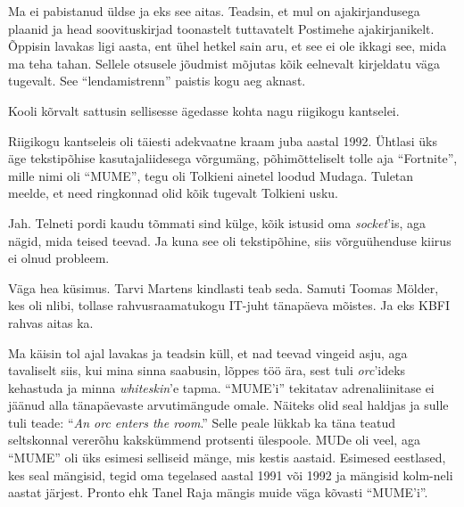 Ma ei pabistanud üldse ja eks see aitas. Teadsin, et mul on
ajakirjandusega plaanid ja head soovituskirjad 
toonastelt tuttavatelt Postimehe ajakirjanikelt. Õppisin 
lavakas ligi aasta, ent ühel hetkel sain aru, et see ei ole ikkagi see, mida ma teha tahan. 
Sellele otsusele jõudmist mõjutas kõik eelnevalt kirjeldatu 
väga tugevalt. See \enquote{lendamistrenn} paistis kogu aeg aknast. 

Kooli kõrvalt sattusin sellisesse ägedasse kohta nagu riigikogu 
kantselei.


Riigikogu kantseleis oli täiesti adekvaatne kraam juba aastal 1992. 
Ühtlasi üks äge tekstipõhise kasutajaliidesega võrgumäng, 
põhimõtteliselt tolle aja \enquote{Fortnite}, mille nimi oli 
\enquote{MUME}, tegu oli Tolkieni ainetel loodud 
Mudaga. Tuletan meelde, et need ringkonnad olid kõik 
tugevalt Tolkieni usku.


Jah. Telneti pordi kaudu tõmmati sind külge, kõik istusid oma 
\emph{socket}'is, aga nägid, mida teised teevad. Ja kuna see oli 
tekstipõhine, siis võrguühenduse kiirus ei olnud probleem.


Väga hea küsimus. Tarvi 
Martens kindlasti teab seda. Samuti
Toomas Mölder, kes oli nlibi, 
tollase rahvusraamatukogu IT-juht tänapäeva mõistes. Ja eks KBFI rahvas aitas ka.


Ma käisin tol ajal lavakas ja teadsin küll, et nad teevad 
vingeid asju, aga tavaliselt siis, kui mina sinna saabusin, 
lõppes töö ära, sest tuli \emph{orc}'ideks kehastuda ja minna 
\emph{whiteskin}'e tapma. \enquote{MUME'i} tekitatav adrenaliinitase ei jäänud alla 
tänapäevaste arvutimängude omale. Näiteks olid seal haldjas ja sulle tuli 
teade: \enquote{\emph{An orc enters the room}.} Selle peale lükkab ka täna teatud 
seltskonnal vererõhu kakskümmend protsenti ülespoole. MUDe oli veel, aga 
\enquote{MUME} oli üks esimesi selliseid mänge, mis kestis aastaid. Esimesed 
eestlased, kes seal mängisid, tegid oma tegelased aastal 1991 või 1992 ja mängisid kolm-neli aastat järjest. Pronto ehk Tanel Raja mängis muide väga kõvasti \enquote{MUME'i}. 

